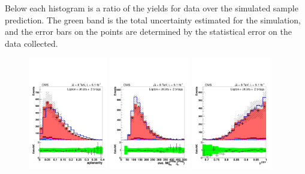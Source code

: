 \noindent Below each histogram is a ratio of the yields for data over the
simulated sample prediction.  The green band is the total uncertainty
estimated for the simulation, and the error bars on the points are
determined by the statistical error on the data collected.  


%
%

\clearpage

\begin{figure}[hbtp]
 \begin{center}
   \includegraphics[width=0.31\textwidth]{Figures/Analysis_1_Diagrams/d2MCPlots_aplanarity_cut3_jge6_t2_Combined_HtWgt.pdf}
   \includegraphics[width=0.31\textwidth]{Figures/Analysis_1_Diagrams/d2MCPlots_avg_untagged_dijet_mass_cut3_jge6_t2_Combined_HtWgt.pdf}
   \includegraphics[width=0.31\textwidth]{Figures/Analysis_1_Diagrams/d2MCPlots_avg_btag_disc_btags_cut3_jge6_t2_Combined_HtWgt.pdf}

\end{center}
\end{figure}
